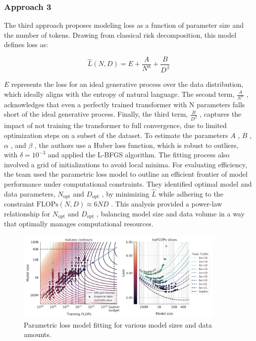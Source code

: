 \documentclass{article}
\begin{document}
\subsubsection{Approach 3}

The third approach proposes modeling loss as a function of parameter size and the number of tokens. Drawing from classical risk decomposition, this model defines loss as:


$$\hat{L}(N, D) = E + \frac{A}{N^\alpha} + \frac{B}{D^\beta}$$

$E$  represents the loss for an ideal generative process over the data distribution, which ideally aligns with the entropy of natural language. The second term,  $\frac{A}{N^\alpha}$ , acknowledges that even a perfectly trained transformer with  N  parameters falls short of the ideal generative process. Finally, the third term,  $\frac{B}{D^\beta}$ , captures the impact of not training the transformer to full convergence, due to limited optimization steps on a subset of the dataset.
To estimate the parameters  $A$ ,  $B$ ,  $\alpha$ , and  $\beta$ , the authors use a Huber loss function, which is robust to outliers, with  $\delta = 10^{-3}$ and applied the L-BFGS algorithm. The fitting process also involved a grid of initializations to avoid local minima.
For evaluating efficiency, the team used the parametric loss model to outline an efficient frontier of model performance under computational constraints. They identified optimal model and data parameters,  $N_{\text{opt}}$  and $ D_{\text{opt}}$ , by minimizing  $\hat{L}$  while adhering to the constraint  $\text{FLOPs}(N, D) \approx 6ND$ . This analysis provided a power-law relationship for  $N_{\text{opt}}$  and  $D_{\text{opt}}$ , balancing model size and data volume in a way that optimally manages computational resources.


\begin{figure}[h]
    \centering
    \includegraphics[width=0.9\textwidth]{figs/Approach3.png}
    \caption{Parametric loss model fitting for various model sizes and data amounts.}
    \label{fig:approach3}
\end{figure}
\end{document}
